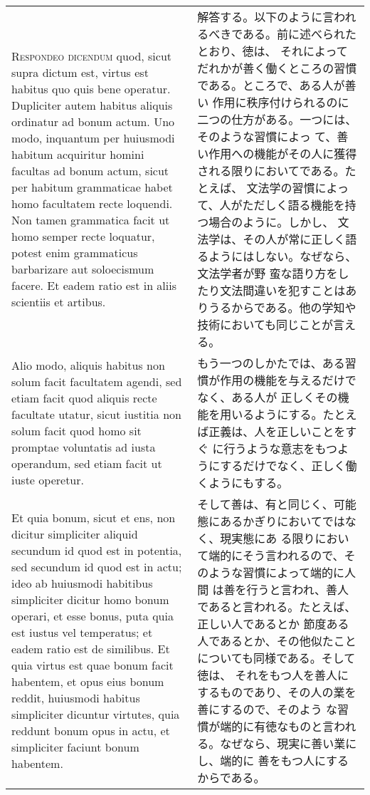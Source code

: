 \documentclass[10pt]{jsarticle}
\begin{document}
\begin{longtable}{p{21em}p{21em}}
\\

{\scshape Respondeo dicendum} quod, sicut supra dictum est, virtus est
habitus quo quis bene operatur. Dupliciter autem habitus aliquis
ordinatur ad bonum actum. Uno modo, inquantum per huiusmodi habitum
acquiritur homini facultas ad bonum actum, sicut per habitum
grammaticae habet homo facultatem recte loquendi. Non tamen grammatica
facit ut homo semper recte loquatur, potest enim grammaticus
barbarizare aut soloecismum facere. Et eadem ratio est in aliis
scientiis et artibus.

&

解答する。以下のように言われるべきである。前に述べられたとおり、徳は、
それによってだれかが善く働くところの習慣である。ところで、ある人が善い
作用に秩序付けられるのに二つの仕方がある。一つには、そのような習慣によっ
て、善い作用への機能がその人に獲得される限りにおいてである。たとえば、
文法学の習慣によって、人がただしく語る機能を持つ場合のように。しかし、
文法学は、その人が常に正しく語るようにはしない。なぜなら、文法学者が野
蛮な語り方をしたり文法間違いを犯すことはありうるからである。他の学知や
技術においても同じことが言える。

\\

Alio modo, aliquis habitus non solum facit facultatem agendi,
sed etiam facit quod aliquis recte facultate utatur, sicut iustitia
non solum facit quod homo sit promptae voluntatis ad iusta operandum,
sed etiam facit ut iuste operetur. 

&

もう一つのしかたでは、ある習慣が作用の機能を与えるだけでなく、ある人が
正しくその機能を用いるようにする。たとえば正義は、人を正しいことをすぐ
に行うような意志をもつようにするだけでなく、正しく働くようにもする。

\\

Et quia bonum, sicut et ens, non
dicitur simpliciter aliquid secundum id quod est in potentia, sed
secundum id quod est in actu; ideo ab huiusmodi habitibus simpliciter
dicitur homo bonum operari, et esse bonus, puta quia est iustus vel
temperatus; et eadem ratio est de similibus. Et quia virtus est quae
bonum facit habentem, et opus eius bonum reddit, huiusmodi habitus
simpliciter dicuntur virtutes, quia reddunt bonum opus in actu, et
simpliciter faciunt bonum habentem. 

&

そして善は、有と同じく、可能態にあるかぎりにおいてではなく、現実態にあ
る限りにおいて端的にそう言われるので、そのような習慣によって端的に人間
は善を行うと言われ、善人であると言われる。たとえば、正しい人であるとか
節度ある人であるとか、その他似たことについても同様である。そして徳は、
それをもつ人を善人にするものであり、その人の業を善にするので、そのよう
な習慣が端的に有徳なものと言われる。なぜなら、現実に善い業にし、端的に
善をもつ人にするからである。


\end{longtable}
\end{document}
